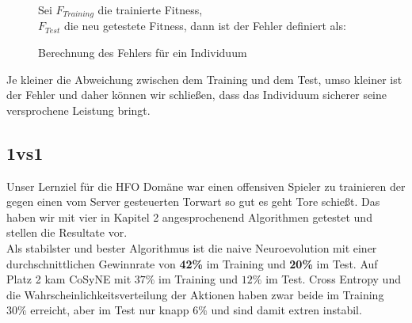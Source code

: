         \begin{figure}[H]
            \begin{mdframed}
                Sei $F_{Training}$ die trainierte Fitness, \\
                \hspace*{4mm} $F_{Test}$ die neu getestete Fitness, dann ist der Fehler definiert als:\\[4mm]
                \hspace*{40mm} 
            \end{mdframed}
            \caption{Berechnung des Fehlers für ein Individuum}
        \end{figure}

        \noindent
        Je kleiner die Abweichung zwischen dem Training und dem Test, umso kleiner ist der Fehler und daher können wir schließen, dass das Individuum sicherer seine versprochene Leistung bringt.\\

        \subsection{1vs1}
            Unser Lernziel für die HFO Domäne war einen offensiven Spieler zu trainieren der gegen einen vom Server gesteuerten Torwart so gut es geht Tore schießt. Das haben wir mit vier in Kapitel 2 angesprochenend Algorithmen getestet und stellen die Resultate vor. \\[2mm]

            \noindent
            Als stabilster und bester Algorithmus ist die naive Neuroevolution mit einer durchschnittlichen Gewinnrate von \textbf{42\%} im Training und \textbf{20\%} im Test. Auf Platz 2 kam CoSyNE mit $37\%$ im Training und $12\%$ im Test. Cross Entropy und die Wahrscheinlichkeitsverteilung der Aktionen haben zwar beide im Training $30\%$ erreicht, aber im Test nur knapp $6\%$ und sind damit extren instabil.
\newpage

